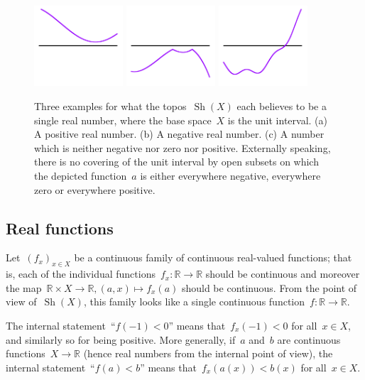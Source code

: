 \documentclass[oneside,reqno]{amsart}
\theoremstyle{definition}
\theoremstyle{plain}
\theoremstyle{remark}
\newcommand{\RR}{\mathbb{R}}
\DeclareMathOperator{\Sh}{Sh}
\renewcommand{\_}{\mathpunct{.}\,}
\newcommand{\?}{\,{:}\,}
\begin{document}
\begin{figure}
  \includegraphics[height=3cm]{trichotomy-1}
  \includegraphics[height=3cm]{trichotomy-2}
  \includegraphics[height=3cm]{trichotomy-3}
  \caption{\label{fig:trichotomy} Three examples for what the topos~$\Sh(X)$
  each believes to be a single real number, where the base space~$X$ is the
  unit interval. (a) A positive real number. (b) A negative real number. (c) A
  number which is neither negative nor zero nor positive. Externally speaking,
  there is no covering of the unit interval by open subsets on which the
  depicted function~$a$ is either everywhere negative, everywhere zero or everywhere
  positive.}
\end{figure}


\subsection{Real functions} Let~$(f_x)_{x \in X}$ be a continuous family of
continuous real-valued functions; that is, each of the individual
functions~$f_x : \RR \to \RR$ should be continuous and moreover the map~$\RR
\times X \to \RR, (a,x) \mapsto f_x(a)$ should be continuous.
From the point of view of~$\Sh(X)$, this family looks like a single continuous
function~$f : \RR \to \RR$.

The internal statement~``$f(-1) < 0$'' means that~$f_x(-1) < 0$ for all~$x \in
X$, and similarly so for being positive. More generally, if~$a$ and~$b$ are
continuous functions~$X \to \RR$ (hence real numbers from the internal point of
view), the internal statement~``$f(a) < b$'' means that~$f_x(a(x)) < b(x)$ for
all~$x \in X$.
\end{document}
